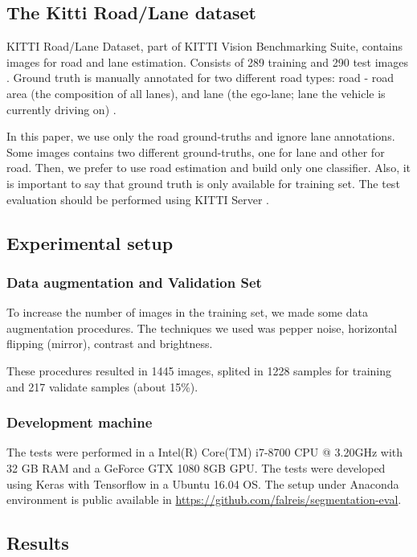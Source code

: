 \subsection{The Kitti Road/Lane dataset}

KITTI Road/Lane Dataset, part of KITTI Vision Benchmarking Suite, contains  images for road and lane estimation. Consists of 289 training and 290 test images . Ground truth is manually annotated for two different road types: road - road area (the composition of all lanes), and lane (the ego-lane; lane the vehicle is currently driving on) \cite{KITTI}. 

In this paper, we use only the road ground-truths and ignore lane annotations. Some images contains two different ground-truths, one for lane and other for road. Then, we prefer to use road estimation and build only one classifier. Also, it is important to say that ground truth is only available for training set. The test evaluation should be performed using KITTI Server \cite{KITTI}. 

\subsection{Experimental setup}

\subsubsection{Data augmentation and Validation Set}

To increase the number of images in the training set, we made some data augmentation procedures. The techniques we used was pepper noise, horizontal flipping (mirror), contrast and brightness.

These procedures resulted in 1445 images, splited in 1228 samples for training and 217 validate samples (about 15\%).

\subsubsection{Development machine}

The tests were performed in a Intel(R) Core(TM) i7-8700 CPU @ 3.20GHz with 32 GB RAM and a GeForce GTX 1080 8GB GPU. The tests were developed using Keras \cite{chollet2015keras} with Tensorflow \cite{tensorflow2015-whitepaper} in a Ubuntu 16.04 OS. The setup under Anaconda environment is public available in \url{https://github.com/falreis/segmentation-eval}.

\subsection{Results}

